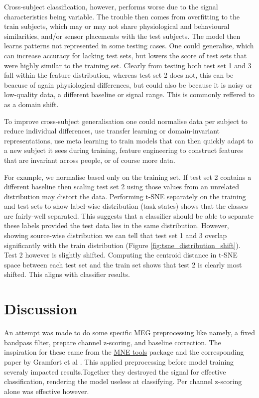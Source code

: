 \documentclass[conference]{IEEEtran}
\begin{document}
Cross-subject classification, however, performs worse due to the signal characteristics being variable. The trouble then comes from overfitting to the train subjects, which may or may not share physiological and behavioural similarities, and/or sensor placements with the test subjects. The model then learns patterns not represented in some testing cases. One could generalise, which can increase accuracy for lacking test sets, but lowers the score of test sets that were highly similar to the training set. Clearly from testing both test set 1 and 3 fall within the feature distribution, whereas test set 2 does not, this can be beacuse of again physiological differences, but could also be because it is noisy or low-quality data, a different baseline or signal range. This is commonly reffered to as a domain shift.

To improve cross-subject generalisation one could normalise data per subject to reduce individual differences, use transfer learning or domain-invariant representations, use meta learning to train models that can then quickly adapt to a new subject it sees during training, feature engineering to construct features that are invariant across people, or of course more data.

For example, we normalise based only on the training set. If test set 2 contains a different baseline then scaling test set 2 using those values from an unrelated distribution may distort the data. Performing t-SNE separately on the training and test sets to show label-wise distribution (task states) shows that the classes are fairly-well separated. This suggests that a classifier should be able to separate these labels provided the test data lies in the same distribution. However, showing source-wise distribution we can tell that test set 1 and 3 overlap significantly with the train distribution (Figure \ref{fig:tsne_distribution_shift}). Test 2 however is slightly shifted. Computing the centroid distance in t-SNE space between each test set and the train set shows that test 2 is clearly most shifted. This aligns with classifier results.

\section{Discussion}
\label{discussion}
An attempt was made to do some specific MEG preprocessing like namely, a fixed bandpass filter, prepare channel z-scoring, and baseline correction. The inspiration for these came from the \href{https://mne.tools/stable/index.html}{MNE tools} package and the corresponding paper by Gramfort et al \cite{gramfort2013meg}. This applied preprocessing before model training severaly impacted results.Together they destroyed the signal for effective classification, rendering the model useless at classifying. Per channel z-scoring alone was effective however. 
\end{document}
